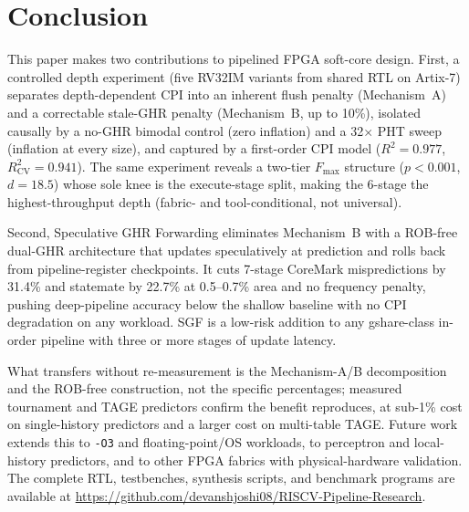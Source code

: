 \documentclass[acmsmall,nonacm,screen]{acmart}
\begin{document}
\section{Conclusion}
\label{sec:conclusion}

This paper makes two contributions to pipelined FPGA soft-core design.
First, a controlled depth experiment (five RV32IM variants from shared RTL on Artix-7) separates depth-dependent CPI into an inherent flush penalty (Mechanism~A) and a correctable stale-GHR penalty (Mechanism~B, up to 10\%), isolated causally by a no-GHR bimodal control (zero inflation) and a 32$\times$ PHT sweep (inflation at every size), and captured by a first-order CPI model ($R^2 = 0.977$, $R^2_{\text{CV}} = 0.941$). The same experiment reveals a two-tier $F_{\max}$ structure ($p < 0.001$, $d = 18.5$) whose sole knee is the execute-stage split, making the 6-stage the highest-throughput depth (fabric- and tool-conditional, not universal).

Second, Speculative GHR Forwarding eliminates Mechanism~B with a ROB-free dual-GHR architecture that updates speculatively at prediction and rolls back from pipeline-register checkpoints. It cuts 7-stage CoreMark mispredictions by 31.4\% and statemate by 22.7\% at 0.5--0.7\% area and no frequency penalty, pushing deep-pipeline accuracy below the shallow baseline with no CPI degradation on any workload. SGF is a low-risk addition to any gshare-class in-order pipeline with three or more stages of update latency.

What transfers without re-measurement is the Mechanism-A/B decomposition and the ROB-free construction, not the specific percentages; measured tournament and TAGE predictors confirm the benefit reproduces, at sub-1\% cost on single-history predictors and a larger cost on multi-table TAGE. Future work extends this to \texttt{-O3} and floating-point/OS workloads, to perceptron and local-history predictors, and to other FPGA fabrics with physical-hardware validation.
The complete RTL, testbenches, synthesis scripts, and benchmark programs are available at \url{https://github.com/devanshjoshi08/RISCV-Pipeline-Research}.



\end{document}
